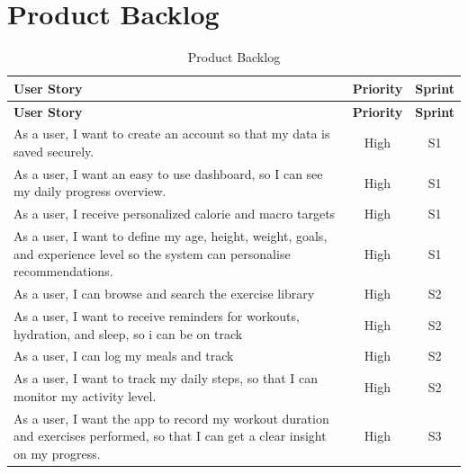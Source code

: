 \section{Product Backlog}
\begin{xltabular}{\textwidth}{Xcc}
	\caption{Product Backlog} \label{tab:backlog} \\
	\toprule
	\textbf{User Story} & \textbf{Priority} & \textbf{Sprint} \\
	\midrule
	\endfirsthead
	
	\toprule
	\textbf{User Story} & \textbf{Priority} & \textbf{Sprint} \\
	\midrule
	\endhead
	
	\endfoot
	
	\bottomrule
	\endlastfoot
	
	As a user, I want to create an account so that my data is saved securely. & High & S1 \\
	
	As a user, I want an easy to use dashboard, so I can see my daily progress overview. & High & S1 \\
	
	As a user, I receive personalized calorie and macro targets & High & S1 \\
	
	As a user, I want to define my age, height, weight, goals, and experience level so the system can personalise recommendations. & High & S1 \\
	
	As a user, I can browse and search the exercise library & High & S2 \\
	
	As a user, I want to receive reminders for workouts, hydration, and sleep, so i can be on track & High & S2 \\
	
	As a user, I can log my meals and track & High & S2 \\
	
	As a user, I want to track my daily steps, so that I can monitor my activity level. & High & S2 \\
	
	As a user, I want the app to record my workout duration and exercises performed, so that I can get a clear insight on my progress. & High & S3 \\
	

\end{xltabular}
